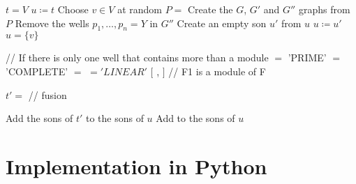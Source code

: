 \begin{algorithm}
    \begin{algorithmic}
                \State $t = V$
            \Else
                \State $u \coloneqq t$
                \State Choose $v \in V$ at random
                \State $P = $ 
                \State Create the $G$, $G'$ and $G''$ graphs from $P$
                    \State Remove the wells $p_1, \dots, p_n = Y$ in $G''$
                    \State {}
                    \State Create an empty son $u'$ from $u$
                    \State $u \coloneqq u'$
                \EndWhile
                \State $u = \{v\}$
            \EndIf
        \EndFunction
    \end{algorithmic}\label{alg:decompose}
\end{algorithm}


\begin{algorithm}
    \begin{algorithmic}
                \State // If there is only one well that contains more than a module
                \State {} $=$ 'PRIME'
            \State {} $=$ 'COMPLETE'
            \State {} $=$ 
            \Else
                \State {} $= 'LINEAR'$
                \State {} $[$ ,  $]$
                \State // F1 is a module of F
            \EndIf

                \State $t' =$ 
                \State // fusion
            \EndFor

                \State Add the sons of $t'$ to the sons of $u$
            \Else
                \State Add to the sons of $u$
            \EndIf
        \EndFunction
    \end{algorithmic}\label{alg:treat}
\end{algorithm}


\section{Implementation in Python}\label{sec:implementation-in-python}

